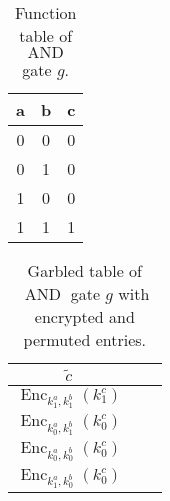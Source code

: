 \begin{table}[htbp]
    \centering
    \begin{tabular}{|c|c||c|}

        a            & b & c \\
        \hline     0 & 0 & 0 \\
        0            & 1 & 0 \\
        1            & 0 & 0 \\
        1            & 1 & 1 \\
    \end{tabular}
    \caption{Function table of $\operatorname{AND}$ gate $g$.}
    \label{tabular:andGate}
\end{table}


\begin{table}[htbp]
    \centering
    \begin{tabular}{|c|c||c|}
        $\tilde{c}$                                           \\
        \hline
        $\operatorname{Enc}_{k_1^a, k_1^b}\left(k_1^c\right)$ \\
        $\operatorname{Enc}_{k_0^a, k_1^b}\left(k_0^c\right)$ \\
        $\operatorname{Enc}_{k_0^a, k_0^b}\left(k_0^c\right)$ \\
        $\operatorname{Enc}_{k_1^a, k_0^b}\left(k_0^c\right)$ \\
    \end{tabular}
    \caption{Garbled table of $\operatorname{AND}$ gate $g$ with encrypted and permuted entries.}
    \label{tabular:garbledAndGate}
\end{table}

